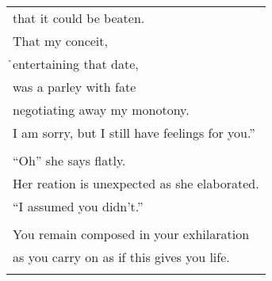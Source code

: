 \documentclass{article}
\begin{document}
\begin{center}
\begin{longtable}{l}
that it could be beaten. \\
That my conceit, \\
\h{}entertaining that date, \\
was a parley with fate \\
negotiating away my monotony. \\
I am sorry, but I still have feelings for you.'' \\
\\
``Oh'' she says flatly. \\
Her reation is unexpected as she elaborated. \\
``I assumed you didn't.'' \\
\\
You remain composed in your exhilaration \\
as you carry on as if this gives you life. \\
\\
\end{longtable}
\end{center}
\end{document}
